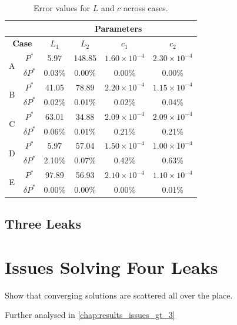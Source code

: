 \begin{table}[h!]
\centering
\begin{tabular}{c|c|cc|cc}
\hline
\multicolumn{2}{c|}{} & \multicolumn{4}{c}{\textbf{Parameters}} \\
\hline
\multicolumn{2}{c|}{\textbf{Case}} & $L_1$ & $L_2$ & $c_1$ & $c_2$ \\
\hline

\multirow{2}{*}{A}
& $P^{*}$        & 5.97   & 148.85 & $1.60\times10^{-4}$ & $2.30\times10^{-4}$ \\
& $\delta P^{*}$ & 0.03\% & 0.00\% & 0.00\%              & 0.00\%              \\
\hline

\multirow{2}{*}{B}
& $P^{*}$        & 41.05  & 78.89  & $2.20\times10^{-4}$ & $1.15\times10^{-4}$ \\
& $\delta P^{*}$ & 0.02\% & 0.01\% & 0.02\%              & 0.04\%              \\
\hline

\multirow{2}{*}{C}
& $P^{*}$        & 63.01  & 34.88  & $2.09\times10^{-4}$ & $2.09\times10^{-4}$ \\
& $\delta P^{*}$ & 0.06\% & 0.01\% & 0.21\%              & 0.21\%              \\
\hline

\multirow{2}{*}{D}
& $P^{*}$        & 5.97   & 57.04  & $1.50\times10^{-4}$ & $1.00\times10^{-4}$ \\
& $\delta P^{*}$ & 2.10\% & 0.07\% & 0.42\%              & 0.63\%              \\
\hline

\multirow{2}{*}{E}
& $P^{*}$        & 97.89  & 56.93  & $2.10\times10^{-4}$ & $1.10\times10^{-4}$ \\
& $\delta P^{*}$ & 0.00\% & 0.00\% & 0.00\%              & 0.01\%              \\
\hline
\end{tabular}
\caption{Error values for $L$ and $c$ across cases.}
\end{table}

\subsection{Three Leaks}

\section{Issues Solving Four Leaks}

Show that converging solutions are scattered all over the place.

Further analysed in \autoref{chap:results_issues_gt_3}